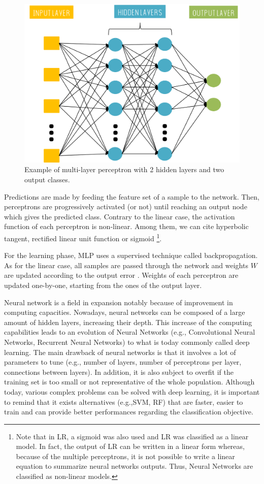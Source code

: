\documentclass[a4paper,10pt]{article}
\begin{document}
\begin{figure}[htbp]
\centerline{\includegraphics[width=0.75\linewidth]{./figures/MLP.png}}
\caption{Example of multi-layer perceptron with 2 hidden layers and two output classes.}
\label{MLPEx}
\end{figure}

Predictions are made by feeding the feature set of a sample to the network. Then, perceptrons are progressively activated (or not) until reaching an output node which gives the predicted class. Contrary to the linear case, the activation function of each perceptron is non-linear. Among them, we can cite hyperbolic tangent, rectified linear unit function or sigmoid \footnote{Note that in LR, a sigmoid was also used and LR was classified as a linear model. In fact, the output of LR can be written in a linear form whereas, because of the multiple perceptrons, it is not possible to write a linear equation to summarize neural networks outputs. Thus, Neural Networks are classified as non-linear models.}.

For the learning phase, MLP uses a supervised technique called backpropagation. As for the linear case, all samples are passed through the network and weights $W$ are updated according to the output error \cite{parizeau2004perceptron}.
Weights of each perceptron are updated one-by-one, starting from the ones of the output layer.

Neural network is a field in expansion notably because of improvement in computing capacities. Nowadays, neural networks can be composed of a large amount of hidden layers, increasing their depth. This increase of the computing capabilities leads to an evolution of  Neural Networks (e.g., Convolutional Neural Networks, Recurrent Neural Networks) to what is today commonly called deep learning. The main drawback of neural networks is that it involves a lot of parameters to tune (e.g., number of layers, number of perceptrons per layer, connections between layers). In addition, it is also subject to overfit if the training set is too small or not representative of the whole population.
Although today, various complex problems can be solved with deep learning, it is important to remind that it exists alternatives (e.g.,SVM, RF) that are faster, easier to train and can provide better performances regarding the classification objective.
\end{document}
